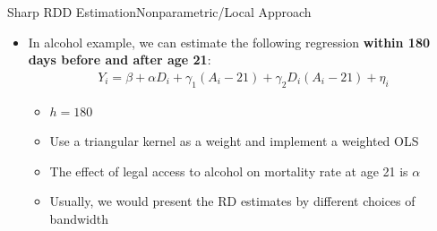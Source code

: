 \documentclass[hyperref={pdfpagelabels=false}]{beamer}
\begin{document}
%		




\begin{frame}{Sharp RDD Estimation}{Nonparametric/Local Approach}
	\begin{itemize}
		
		
		\item In alcohol example, we can estimate the following regression \textbf{within 180 days before and after age 21}:
		\begin{multline*}
		Y_i=\beta+\alpha D_{i}+\gamma_{1}(A_{i}-21) +\gamma_{2}D_{i}(A_{i}-21)+\eta_i 
		\end{multline*}
	\begin{itemize}		
		\item $h=180$
		\vspace{0.2cm}	
		\item Use a triangular kernel as a weight and implement a weighted OLS
		\vspace{0.2cm}
		\item The effect of legal access to alcohol on mortality rate at age 21 is $\alpha$
		\vspace{0.2cm}
		\item Usually, we would present the RD estimates by different choices of bandwidth
		\vspace{0.2cm}	
			\end{itemize}
	\end{itemize}
\end{frame}
\end{document}
